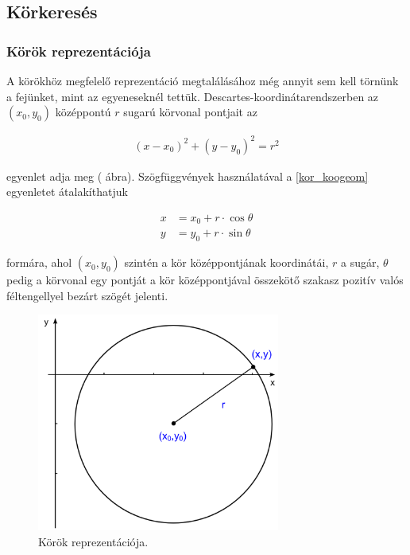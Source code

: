 \subsection{Körkeresés}\label{sect:korkereses}

\subsubsection{Körök reprezentációja}\label{sect:korok_reprezentacioja}

A körökhöz megfelelő reprezentáció megtalálásához még annyit sem kell törnünk a fejünket, mint az egyeneseknél tettük. Descartes-koordinátarendszerben az $ (x_{0}, y_{0}) $ középpontú $ r $ sugarú körvonal pontjait az

\begin{align}\label{eq:kor_koogeom}
( x - x_{0})^{2} + (y - y_{0})^2 = r^2
\end{align}

egyenlet adja meg ( ábra). Szögfüggvények használatával a \eqref{kor_koogeom} egyenletet átalakíthatjuk

\begin{align}\label{eq:kor_param}
x &= x_{0} + r \cdot \cos \theta \nonumber \\
y &= y_{0} + r \cdot \sin \theta
\end{align}

formára, ahol $ (x_{0}, y_{0}) $ szintén a kör középpontjának koordinátái, $ r $ a sugár, $ \theta $ pedig a körvonal egy pontját a kör középpontjával összekötő szakasz pozitív valós féltengellyel bezárt szögét jelenti.

\begin{figure}[!ht]
\centering
\includegraphics[width=80mm, keepaspectratio]{figures/repr_circle.png}
\caption{Körök reprezentációja.}
\label{fig:repr_circle}
\end{figure}

